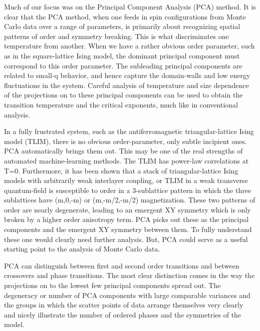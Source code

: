 \documentclass[pra,letterpaper,10pt,twocolumn]{revtex4}
\begin{document}

Much of our focus was on the Principal Component Analysis (PCA) method. It is
clear that the PCA method, when one feeds in spin 
configurations from Monte Carlo data over a range of parameters, is primarily
about recognizing spatial patterns of order and symmetry breaking. This
is what discriminates one temperature from another. When we have a
rather obvious order parameter, such as in the square-lattice Ising model,
the dominant principal component must correspond to this order parameter.
The subleading principal components are related to small-q behavior,
and hence capture the domain-walls and low energy fluctuations in the system. 
Careful analysis of temperature and size dependence of the projections
on to these principal components can be used to obtain the transition 
temperature and the critical exponents, much like in conventional analysis.

In a fully frustrated system, such as the antiferromagnetic
triangular-lattice Ising model (TLIM), there is no obvious
order-parameter, only subtle incipient ones.  PCA automatically brings
them out. This may be one of the real strengths of automated
machine-learning methods. The TLIM has power-law correlations at T=0.
Furthermore, it has been shown\cite{moessner, grest} that a stack of
triangular-lattice Ising models with arbitrarily weak interlayer
coupling, or TLIM in a weak transverse quantum-field is susceptible to
order in a 3-sublattice pattern in which the three sublattices have
(m,0,-m) or (m,-m/2,-m/2) magnetization. These two patterns of order are
nearly degenerate, leading to an emergent XY symmetry which is only
broken by a higher order anisotropy term. PCA picks out these as the
principal components and the emergent XY symmetry between them. To fully
understand these one would clearly need further analysis. But, PCA could
serve as a useful starting point to the analysis of Monte Carlo data.

PCA can distinguish between first and second order transitions and between
crossovers and phase transitions. The most clear distinction comes in the
way the projections on to the lowest few principal components spread out.
The degeneracy or number of PCA components with large comparable variances 
and the groups in which the scatter points
of data arrange themselves very clearly and nicely
illustrate the number of ordered phases and
the symmetries of the model.
\end{document}

